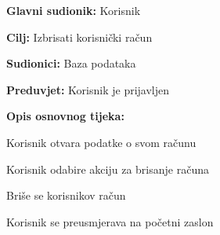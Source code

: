 \noindent {}
\begin{packed_item}
	
	\item \textbf{Glavni sudionik:} Korisnik
	\item  \textbf{Cilj:} Izbrisati korisnički račun
	\item  \textbf{Sudionici:} Baza podataka
	\item  \textbf{Preduvjet:} Korisnik je prijavljen
	\item  \textbf{Opis osnovnog tijeka:}
	
	\item[] \begin{packed_enum}
		
		\item Korisnik otvara podatke o svom računu
		\item Korisnik odabire akciju za brisanje računa
		\item Briše se korisnikov račun
		\item Korisnik se preusmjerava na početni zaslon
		
	\end{packed_enum}
\end{packed_item}

